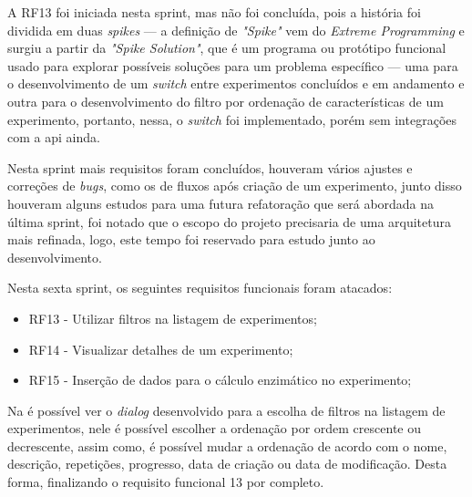 A RF13 foi iniciada nesta sprint, mas não foi concluída, pois a história foi dividida em duas \textit{spikes} — a definição de \textit{"Spike"} vem do \textit{Extreme Programming} e surgiu a partir da \textit{"Spike Solution"}, que é um programa ou protótipo funcional usado para explorar possíveis soluções para um problema específico — uma para o desenvolvimento de um \textit{switch} entre experimentos concluídos e em andamento e outra para o desenvolvimento do filtro por ordenação de características de um experimento, portanto, nessa, o \textit{switch} foi implementado, porém sem integrações com a \ac{api} ainda.

Nesta sprint mais requisitos foram concluídos, houveram vários ajustes e correções de \textit{bugs}, como os de fluxos após criação de um experimento, junto disso houveram alguns estudos para uma futura refatoração que será abordada na última sprint, foi notado que o escopo do projeto precisaria de uma arquitetura mais refinada, logo, este tempo foi reservado para estudo junto ao desenvolvimento.  
 
Nesta sexta sprint, os seguintes requisitos funcionais foram atacados:
\begin{itemize}
   \item RF13 - Utilizar filtros na listagem de experimentos;
   \item RF14 - Visualizar detalhes de um experimento;
   \item RF15 - Inserção de dados para o cálculo enzimático no experimento;
 \end{itemize}

Na  é possível ver o \textit{dialog} desenvolvido para a escolha de filtros na listagem de experimentos, nele é possível escolher a ordenação por ordem crescente ou decrescente, assim como, é possível mudar a ordenação de acordo com o nome, descrição, repetições, progresso, data de criação ou data de modificação. Desta forma, finalizando o requisito funcional 13 por completo.
 
